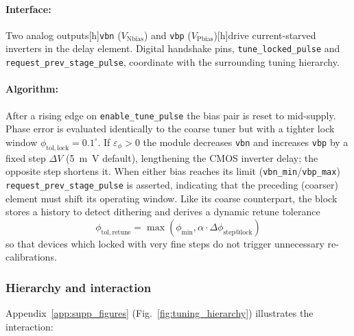 \paragraph{Interface:}

Two analog
 outputs[h]\texttt{vbn} (\(V_\mathrm{N bias}\)) and \texttt{vbp} (\(V_\mathrm{P bias}\))[h]drive current-starved inverters in the delay element.
Digital handshake pins, \texttt{tune\_locked\_pulse} and
\texttt{request\_prev\_stage\_pulse}, coordinate with the surrounding
tuning hierarchy.

\paragraph{Algorithm:}

After a rising edge on \texttt{enable\_tune\_pulse} the bias pair is reset to mid-supply.
Phase error is evaluated identically to the coarse tuner but with a
tighter lock window \(\phi_\mathrm{tol,lock}=0.1^{\circ}\).
If \(\varepsilon_\phi>0\) the module decreases \texttt{vbn} and
increases \texttt{vbp} by a fixed step \(\Delta V\)
(\SI{5}{m\volt} default), lengthening the CMOS inverter delay;
the opposite step shortens it.
When either bias reaches its limit (\texttt{vbn\_min}/\texttt{vbp\_max})
\texttt{request\_prev\_stage\_pulse} is asserted, indicating that the
preceding (coarser) element must shift its operating window.
Like its coarse counterpart, the block stores a history to detect dithering and
derives a dynamic retune tolerance
\[
\phi_\mathrm{tol,retune}= \max\!\left(
                \phi_\mathrm{min},
                \alpha \cdot \Delta\!\phi_\mathrm{step@lock}
            \right)
\]
so that devices which locked with very fine steps do not trigger
unnecessary re-calibrations.

\subsubsection{Hierarchy and interaction}
Appendix~\ref{app:supp_figures} (Fig.~\ref{fig:tuning_hierarchy}) illustrates the interaction:

